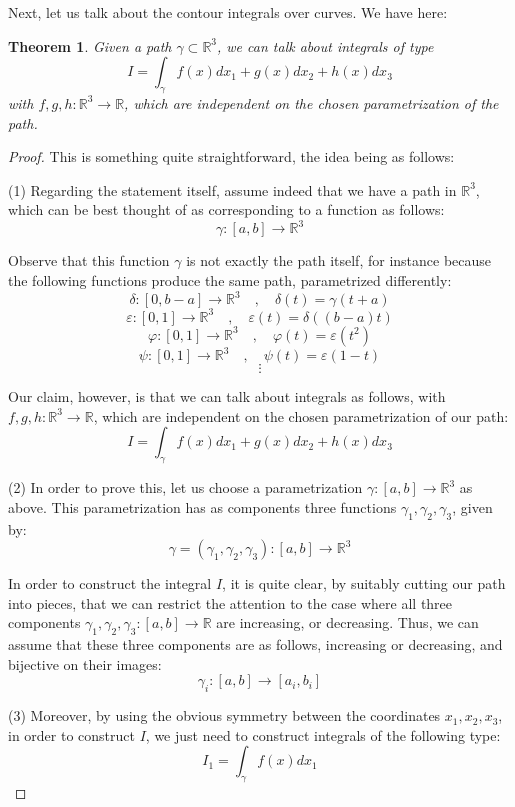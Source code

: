 \documentclass[12pt]{amsbook}
\newtheorem{theorem}{Theorem}[chapter]
\begin{document}
Next, let us talk about the contour integrals over curves. We have here:

\begin{theorem}
Given a path $\gamma\subset\mathbb R^3$, we can talk about integrals of type
$$I=\int_\gamma f(x)dx_1+g(x)dx_2+h(x)dx_3$$ 
with $f,g,h:\mathbb R^3\to\mathbb R$, which are independent on the chosen parametrization of the path.
\end{theorem}

\begin{proof}
This is something quite straightforward, the idea being as follows:

\medskip

(1) Regarding the statement itself, assume indeed that we have a path in $\mathbb R^3$, which can be best thought of as corresponding to a function as follows:
$$\gamma:[a,b]\to\mathbb R^3$$

Observe that this function $\gamma$ is not exactly the path itself, for instance because the following functions produce the same path, parametrized differently:
$$\delta:[0,b-a]\to\mathbb R^3\quad,\quad \delta(t)=\gamma(t+a)$$
$$\varepsilon:[0,1]\to\mathbb R^3\quad,\quad \varepsilon(t)=\delta((b-a)t)$$
$$\varphi:[0,1]\to\mathbb R^3\quad,\quad \varphi(t)=\varepsilon(t^2)$$
$$\psi:[0,1]\to\mathbb R^3\quad,\quad \psi(t)=\varepsilon(1-t)$$
$$\vdots$$

Our claim, however, is that we can talk about integrals as follows, with $f,g,h:\mathbb R^3\to\mathbb R$, which are independent on the chosen parametrization of our path:
$$I=\int_\gamma f(x)dx_1+g(x)dx_2+h(x)dx_3$$ 

(2) In order to prove this, let us choose a parametrization $\gamma:[a,b]\to\mathbb R^3$ as above. This parametrization has as components three functions $\gamma_1,\gamma_2,\gamma_3$, given by:
$$\gamma=(\gamma_1,\gamma_2,\gamma_3):[a,b]\to\mathbb R^3$$

In order to construct the integral $I$, it is quite clear, by suitably cutting our path into pieces, that we can restrict the attention to the case where all three components $\gamma_1,\gamma_2,\gamma_3:[a,b]\to\mathbb R$ are increasing, or decreasing. Thus, we can assume that these three components are as follows, increasing or decreasing, and bijective on their images:
$$\gamma_i:[a,b]\to[a_i,b_i]$$

(3) Moreover, by using the obvious symmetry between the coordinates $x_1,x_2,x_3$, in order to construct $I$, we just need to construct integrals of the following type:
$$I_1=\int_\gamma f(x)dx_1$$ 


\end{proof}
\end{document}
